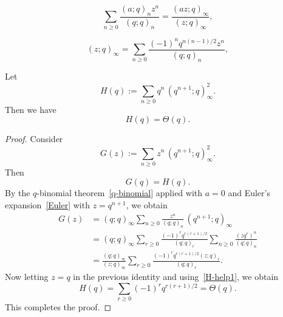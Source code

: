 \documentclass[10pt,a4paper]{amsart}
\newcommand{\fr}{\frac}
\newcommand{\qpochn}[3]{(#1;#2)_{#3}}
\newcommand{\qpoch}[2]{(#1;#2)_\infty}
\begin{document}
\begin{equation}\label{q-binomial}
\sum_{n\geq 0}\fr{(a;q)_n z^n}{(q;q)_n} = \fr{(az;q)_\infty}{(z;q)_\infty},
\end{equation}

\begin{equation}\label{Euler}
\qpoch{z}{q}=\sum_{n\ge 0}\frac{(-1)^n q^{n(n-1)/2}z^n}{\qpochn{q}{q}{n}},
\end{equation}

\begin{lemma}\label{lem:H-theta}
Let
\[
H(q):=\sum_{n\ge 0} q^n\,\qpoch{q^{n+1}}{q}^{2}.
\]
Then we have
\[
H(q)=\Theta(q).
\]
\end{lemma}

\begin{proof}
Consider
\[
G(z):=\sum_{n\ge 0} z^n\,\qpoch{q^{n+1}}{q}^{2}.
\]
Then
\begin{equation}\label{H-help1}
G(q) = H(q).
\end{equation}
By the $q$-binomial theorem~\eqref{q-binomial}
applied with $a=0$ and Euler's expansion~\eqref{Euler} with $z=q^{n+1}$, we obtain
\begin{align*}
G(z)
&=\qpoch{q}{q}\sum_{n\ge 0}\frac{z^n}{\qpochn{q}{q}{n}}\,\qpoch{q^{n+1}}{q} \\
&=\qpoch{q}{q}\sum_{r\ge 0}\frac{(-1)^r q^{r(r+1)/2}}{\qpochn{q}{q}{r}}
   \sum_{n\ge 0}\frac{(zq^r)^n}{\qpochn{q}{q}{n}} \\
&=\frac{\qpoch{q}{q}}{\qpoch{z}{q}}
  \sum_{r\ge 0}\frac{(-1)^r q^{r(r+1)/2}\qpochn{z}{q}{r}}{\qpochn{q}{q}{r}}.
\end{align*}
Now letting $z=q$ in the previous identity and using~\eqref{H-help1}, we obtain
\[
H(q)=\sum_{r\ge 0}(-1)^r q^{r(r+1)/2}=\Theta(q).
\]
This completes the proof.
\end{proof}
\end{document}
